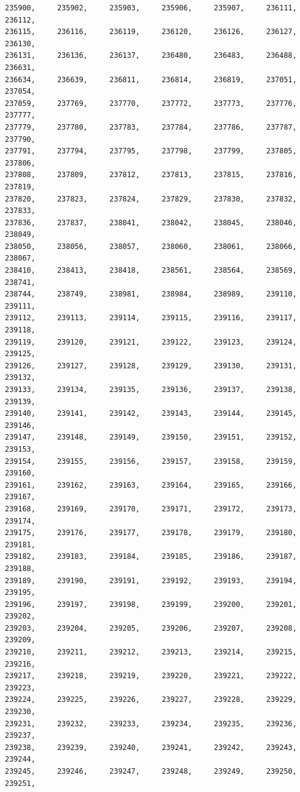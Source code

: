 \documentclass[a4paper,11pt]{report}
\begin{document}
\begin{verbatim}
235900,     235902,     235903,     235906,     235907,     236111,     236112,
236115,     236116,     236119,     236120,     236126,     236127,     236130,
236131,     236136,     236137,     236480,     236483,     236488,     236631,
236634,     236639,     236811,     236814,     236819,     237051,     237054,
237059,     237769,     237770,     237772,     237773,     237776,     237777,
237779,     237780,     237783,     237784,     237786,     237787,     237790,
237791,     237794,     237795,     237798,     237799,     237805,     237806,
237808,     237809,     237812,     237813,     237815,     237816,     237819,
237820,     237823,     237824,     237829,     237830,     237832,     237833,
237836,     237837,     238041,     238042,     238045,     238046,     238049,
238050,     238056,     238057,     238060,     238061,     238066,     238067,
238410,     238413,     238418,     238561,     238564,     238569,     238741,
238744,     238749,     238981,     238984,     238989,     239110,     239111,
239112,     239113,     239114,     239115,     239116,     239117,     239118,
239119,     239120,     239121,     239122,     239123,     239124,     239125,
239126,     239127,     239128,     239129,     239130,     239131,     239132,
239133,     239134,     239135,     239136,     239137,     239138,     239139,
239140,     239141,     239142,     239143,     239144,     239145,     239146,
239147,     239148,     239149,     239150,     239151,     239152,     239153,
239154,     239155,     239156,     239157,     239158,     239159,     239160,
239161,     239162,     239163,     239164,     239165,     239166,     239167,
239168,     239169,     239170,     239171,     239172,     239173,     239174,
239175,     239176,     239177,     239178,     239179,     239180,     239181,
239182,     239183,     239184,     239185,     239186,     239187,     239188,
239189,     239190,     239191,     239192,     239193,     239194,     239195,
239196,     239197,     239198,     239199,     239200,     239201,     239202,
239203,     239204,     239205,     239206,     239207,     239208,     239209,
239210,     239211,     239212,     239213,     239214,     239215,     239216,
239217,     239218,     239219,     239220,     239221,     239222,     239223,
239224,     239225,     239226,     239227,     239228,     239229,     239230,
239231,     239232,     239233,     239234,     239235,     239236,     239237,
239238,     239239,     239240,     239241,     239242,     239243,     239244,
239245,     239246,     239247,     239248,     239249,     239250,     239251,

\end{verbatim}
\end{document}
